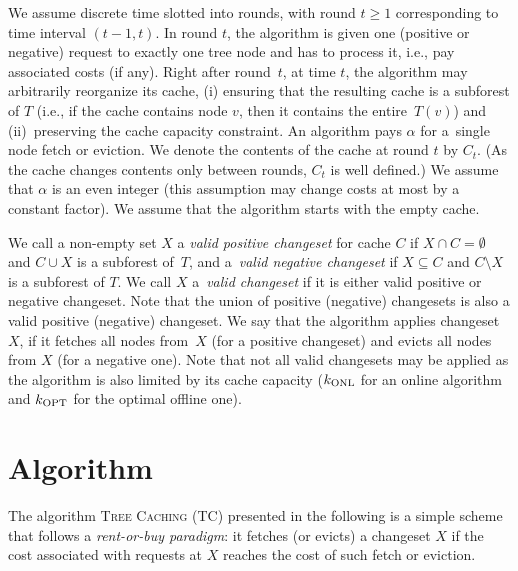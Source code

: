 \documentclass[sigconf,screen=true]{acmart}
\newcommand{\ALG}{\textsc{TC}\xspace}
\newcommand{\kALG}{k_\textnormal{ONL}}
\newcommand{\kOPT}{k_\textnormal{OPT}}
\begin{document}
We assume discrete time slotted into rounds, with round $t \geq 1$
corresponding to time interval $(t-1,t)$. In round $t$, the algorithm is given
one (positive or negative) request to exactly one tree node and has to process
it, i.e., pay associated costs (if any). Right after round~$t$, at time $t$,
the algorithm may arbitrarily reorganize its cache, (i) ensuring that the
resulting cache is a subforest of $T$ (i.e., if the cache contains node $v$,
then it contains the entire~$T(v)$) and (ii)~preserving the cache capacity
constraint. An algorithm pays $\alpha$ for a~single node fetch or eviction. We
denote the contents of the cache at round $t$ by $C_t$. (As the cache changes
contents only between rounds, $C_t$ is well defined.) We assume that $\alpha$
is an even integer (this assumption may change costs at most by a constant
factor). We assume that the algorithm starts with the empty cache.

We call a non-empty set $X$ a \emph{valid positive changeset} for cache $C$ if
$X \cap C = \emptyset$ and $C \cup X$ is a subforest of~$T$, and a~\emph{valid
negative changeset} if $X \subseteq C$ and $C \setminus X$ is a subforest of
$T$. We call $X$ a~\emph{valid changeset} if it is either valid positive or
negative changeset. Note that the union of positive (negative) changesets is
also a valid positive (negative) changeset. We say that the algorithm applies
changeset~$X$, if it fetches all nodes from~$X$ (for a positive changeset) and
evicts all nodes from $X$ (for a negative one). Note that not all valid
changesets may be applied as the algorithm is also limited by its cache capacity
($\kALG$ for an online algorithm and $\kOPT$ for the optimal offline one).



\section{Algorithm}\label{sec:algo}

The algorithm \textsc{Tree Caching} (\ALG) presented in the following is
a simple scheme that follows a \emph{rent-or-buy paradigm}: it fetches (or evicts)
a changeset $X$ if the cost associated with requests at $X$ reaches the cost of 
such fetch or eviction.
\end{document}
